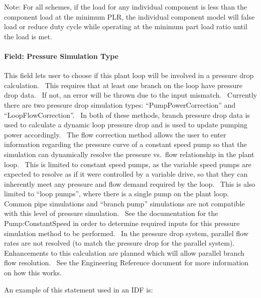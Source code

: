Note: For all schemes, if the load for any individual component is less than the component load at the minimum PLR, the individual component model will false load or reduce duty cycle while operating at the minimum part load ratio until the load is met.

\paragraph{Field: Pressure Simulation Type}\label{field-pressure-simulation-type-1}

This field lets user to choose if this plant loop will be involved in a pressure drop calculation.~ This requires that at least one branch on the loop have pressure drop data.~ If not, an error will be thrown due to the input mismatch.~ Currently there are two pressure drop simulation types: ``PumpPowerCorrection'' and ``LoopFlowCorrection''.~ In both of these methods, branch pressure drop data is used to calculate a dynamic loop pressure drop and is used to update pumping power accordingly.~ The flow correction method allows the user to enter information regarding the pressure curve of a constant speed pump so that the simulation can dynamically resolve the pressure vs.~flow relationship in the plant loop.~ This is limited to constant speed pumps, as the variable speed pumps are expected to resolve as if it were controlled by a variable drive, so that they can inherently meet any pressure and flow demand required by the loop.~ This is also limited to ``loop pumps'', where there is a single pump on the plant loop.~ Common pipe simulations and ``branch pump'' simulations are not compatible with this level of pressure simulation.~ See the documentation for the Pump:ConstantSpeed in order to determine required inputs for this pressure simulation method to be performed.~ In the pressure drop system, parallel flow rates are not resolved (to match the pressure drop for the parallel system).~ Enhancements to this calculation are planned which will allow parallel branch flow resolution.~ See the Engineering Reference document for more information on how this works.

An example of this statement used in an IDF is:

